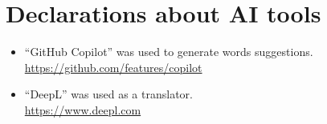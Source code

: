 \documentclass{article}
\begin{document}
\vfill
\setlength{\bibitemsep}{1.2\baselineskip}
\printbibliography[title={References}]

\section*{Declarations about AI tools}
\begin{itemize}
    \item ``GitHub Copilot'' was used to generate words suggestions.\\
        \url{https://github.com/features/copilot}
    \item ``DeepL'' was used as a translator.\\
        \url{https://www.deepl.com}
\end{itemize}
\end{document}
